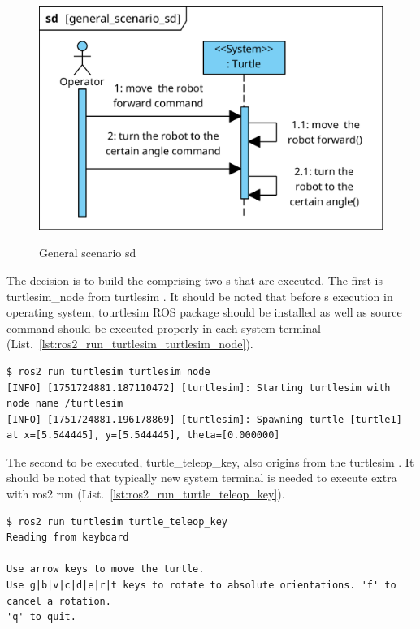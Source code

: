 \documentclass[11pt,oneside,a4paper]{report}
\begin{document}
\begin{figure}[H]
	\centering
	\begin{center}
		{\includegraphics[scale=1.0]{diagrams/general_scenario_sd.png}}
	\end{center}
	\caption{General scenario sd}
	\label{fig:general_scenario_sd}
\end{figure}


The decision is to build the \stSystem{} comprising two \stNode{}s that are executed. The first is \textsf{turtlesim\_node} \stNode{} from \textsf{turtlesim} \stPackage{}. It should be noted that before \stNode{}s execution in operating system, tourtlesim ROS package should be installed as well as source command should be executed properly in each system terminal (List.~\ref{lst:ros2_run_turtlesim_turtlesim_node}).

\begin{lstlisting}[style=terminal,label={lst:ros2_run_turtlesim_turtlesim_node},caption={ros2 run turtlesim turtlesim\_node}]
$ ros2 run turtlesim turtlesim_node
[INFO] [1751724881.187110472] [turtlesim]: Starting turtlesim with node name /turtlesim
[INFO] [1751724881.196178869] [turtlesim]: Spawning turtle [turtle1] at x=[5.544445], y=[5.544445], theta=[0.000000]
\end{lstlisting}

The second \stNode{} to be executed, \textsf{turtle\_teleop\_key}, also origins from the \textsf{turtlesim} \stPackage{}. It should be noted that typically new system terminal is needed to execute extra \stNode{} with \textsf{ros2 run} \stCLTool{} (List.~\ref{lst:ros2_run_turtle_teleop_key}).

\begin{lstlisting}[style=terminal,label={lst:ros2_run_turtle_teleop_key},caption={ros2 run turtlesim turtle\_teleop\_key}]
$ ros2 run turtlesim turtle_teleop_key
Reading from keyboard
---------------------------
Use arrow keys to move the turtle.
Use g|b|v|c|d|e|r|t keys to rotate to absolute orientations. 'f' to cancel a rotation.
'q' to quit.
\end{lstlisting}
\end{document}
